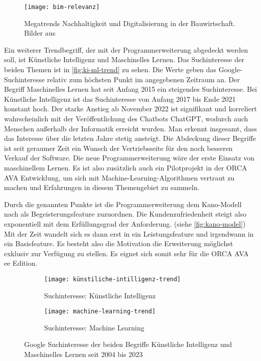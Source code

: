 \begin{figure}[h]
	\centering
	\texttt{[image: bim-relevanz]}
	\caption[Relevanz \ac{bim}]
	{Megatrends Nachhaltigkeit und Digitalisierung in der Bauwirtschaft. Bilder aus \citep[vgl.][p.~20]{RolandBerger2016}}
	\label{fig:bim}
\end{figure}
Ein weiterer Trendbegriff, der mit der Programmerweiterung abgedeckt werden soll, ist \glqq Künstliche Intelligenz\grqq{} und \glqq Maschinelles Lernen\grqq{}. Das Suchinteresse der beiden Themen ist in \autoref{fig:ki-ml-trend} zu sehen. Die Werte geben das Google-Suchinteresse relativ zum höchsten Punkt im angegebenen Zeitraum an. Der Begriff \glqq Maschinelles Lernen\grqq{} hat seit Anfang 2015 ein steigendes Suchinteresse. Bei \glqq Künstliche Intelligenz\grqq{} ist das Suchinteresse von Anfang 2017 bis Ende 2021 konstant hoch. Der starke Anstieg ab November 2022 ist signifikant und korreliert wahrscheinlich mit der Veröffentlichung des Chatbots ChatGPT, wodurch auch Menschen außerhalb der Informatik erreicht wurden. Man erkennt insgesamt, dass das Interesse über die letzten Jahre stetig ansteigt. Die Abdeckung dieser Begriffe ist seit geraumer Zeit ein Wunsch der Vertriebsseite für den noch besseren Verkauf der Software. Die neue Programmerweiterung wäre der erste Einsatz von maschinellem Lernen. Es ist also zusätzlich auch ein Pilotprojekt in der ORCA AVA Entwicklung, um sich mit Machine-Learning-Algorithmen vertraut zu machen und Erfahrungen in diesem Themengebiet zu sammeln. 

Durch die genannten Punkte ist die Programmerweiterung dem Kano-Modell nach als Begeisterungsfeature zuzuordnen. Die Kundenzufriedenheit steigt also exponentiell mit dem Erfüllungsgrad der Anforderung. (siehe \autoref{fig:kano-model}) Mit der Zeit wandelt sich es dann erst in ein Leistungsfeature und irgendwann in ein Basisfeature. \citep[vgl.][p.~3-4]{Hölzing_2008} Es besteht also die Motivation die Erweiterung möglichst exklusiv zur Verfügung zu stellen. Es eignet sich somit sehr für die ORCA AVA \ac{ee} Edition.

\begin{figure}[tb]
	\centering
	
	\begin{subfigure}{0.99\textwidth}
		\centering
	\texttt{[image: künstiliche-intilligenz-trend]}
		\caption{Suchinteresse: Künstliche Intelligenz}
		\label{FIG:ki-trend}
	\end{subfigure}
	\hspace{1cm}
	\begin{subfigure}{0.99\textwidth}
		\centering
	\texttt{[image: machine-learning-trend]}
		\caption{Suchinteresse: Machine Learning}
		\label{FIG:ml-trend}
	\end{subfigure}
	
	\caption[Google Trends]{Google Suchinteresse der beiden Begriffe \glqq Künstliche Intelligenz\grqq{} und \glqq Maschinelles Lernen{} seit 2004 bis 2023}
	\label{fig:ki-ml-trend}
\end{figure}

